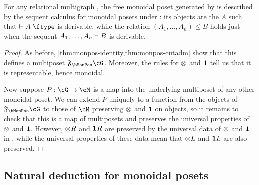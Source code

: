 \begin{thm}\label{thm:monpos-initial}
  For any relational multigraph \cG, the free monoidal poset generated by \cG is described by the sequent calculus for monoidal posets under \cG: its objects are the $A$ such that $\types A\type$ is derivable, while the relation $(A_1,\dots,A_n)\le B$ holds just when the sequent $A_1,\dots,A_n\vdash B$ is derivable.
\end{thm}
\begin{proof}
  As before, \cref{thm:monpos-identity,thm:monpos-cutadm} show that this defines a multiposet $\F\bMonPos\cG$.
  Moreover, the rules for $\otimes$ and $\mathbf{1}$ tell us that it is representable, hence monoidal.

  Now suppose $P:\cG\to\cM$ is a map into the underlying multiposet of any other monoidal poset.
  We can extend $P$ uniquely to a function from the objects of $\F\bMonPos\cG$ to those of $\cM$ preserving $\otimes$ and $\mathbf{1}$ on objects, so it remains to check that this is a map of multiposets and preserves the universal properties of $\otimes$ and $\mathbf{1}$.
  However, $\mathord{\otimes}R$ and $\mathbf{1} R$ are preserved by the universal data of $\otimes$ and $\mathbf{1}$ in \cM, while the universal properties of these data mean that $\mathord{\otimes}L$ and $\mathbf{1} L$ are also preserved.
\end{proof}

\subsection{Natural deduction for monoidal posets}
\label{sec:natded-monpos}

